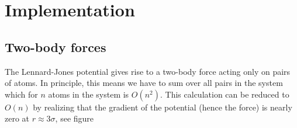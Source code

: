 \section{Implementation}
\subsection{Two-body forces}
The Lennard-Jones potential gives rise to a two-body force acting only on pairs of atoms. In principle, this means we have to sum over all pairs in the system which for $n$ atoms in the system is $O(n^2)$. This calculation can be reduced to $O(n)$ by realizing that the gradient of the potential (hence the force) is nearly zero at $r\approx 3\sigma$, see figure 